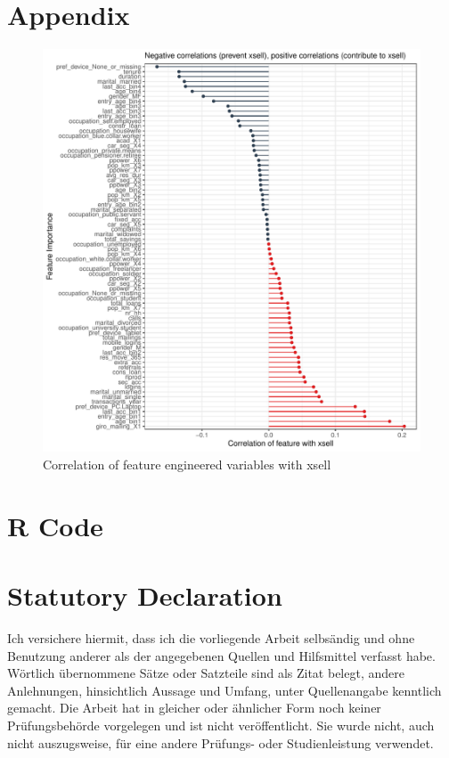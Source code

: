 \documentclass[12pt,a4paper]{article}
\begin{document}
\section{Appendix}
\begin{figure}[ht]
	\centering
  \includegraphics[scale=0.8]{figures/corrplot.pdf}
	\caption{Correlation of feature engineered variables with xsell}
	\label{fig_corr}
\end{figure}
\clearpage

\section{R Code}





\clearpage


\newpage
\thispagestyle{empty}
\section*{Statutory Declaration}

Ich versichere hiermit, dass ich die vorliegende Arbeit selbs\"andig und ohne Benutzung anderer als der angegebenen Quellen und Hilfsmittel verfasst habe. W\"ortlich \"ubernommene S\"atze oder Satzteile sind als Zitat belegt, andere Anlehnungen, hinsichtlich Aussage und Umfang, unter Quellenangabe kenntlich gemacht. Die Arbeit hat in gleicher oder \"ahnlicher Form noch keiner Pr\"ufungsbeh\"orde vorgelegen und ist nicht ver\"offentlicht. Sie wurde nicht, auch nicht auszugsweise, f\"ur eine andere Pr\"ufungs- oder Studienleistung verwendet.
\end{document}
